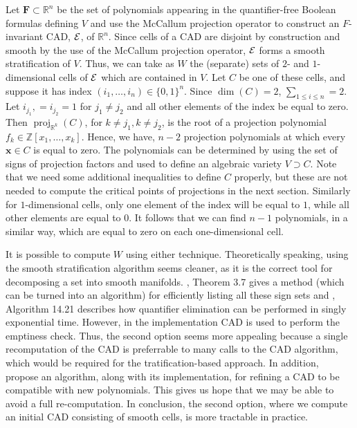 \documentclass[
]{book}
\theoremstyle{definition}
\theoremstyle{definition}
\theoremstyle{definition}
\theoremstyle{definition}
\theoremstyle{remark}
\begin{document}
Let \(\mathbf{F} \subset \mathbb{R}^n\) be the set of polynomials appearing in the quantifier-free Boolean formulas defining \(V\) and use the McCallum projection operator to construct an \(F\)-invariant CAD, \(\cal E\), of \(\mathbb{R}^n\). Since cells of a CAD are disjoint by construction and smooth by the use of the McCallum projection operator, \(\cal E\) forms a smooth stratification of \(V\).
Thus, we can take as \(W\) the (separate) sets of \(2\)- and \(1\)-dimensional cells of \(\cal E\) which are contained in \(V\).
Let \(C\) be one of these cells, and suppose it has index \((i_1,\ldots,i_n) \in \{0,1\}^n\). Since \(\dim(C) = 2\), \(\sum_{1\le i \le n} = 2\). Let \(i_{j_1}, = i_{j_2} = 1\) for \(j_1 \ne j_2\) and all other elements of the index be equal to zero. Then \({\operatorname{proj}_{\mathbb{R}^{k}}}(C)\), for \(k\ne j_1,k\ne j_2\), is the root of a projection polynomial \(f_k \in \mathbb{Z}[x_1,\ldots,x_k]\). Hence, we have, \(n-2\) projection polynomials at which every \(\mathbf{x} \in C\) is equal to zero.
The polynomials can be determined by using the set of signs of projection factors and used to define an algebraic variety \(V \supset C\). Note that we need some additional inequalities to define \(C\) properly, but these are not needed to compute the critical points of projections in the next section.
Similarly for \(1\)-dimensional cells, only one element of the index will be equal to \(1\), while all other elements are equal to \(0\). It follows that we can find \(n-1\) polynomials, in a similar way, which are equal to zero on each one-dimensional cell.

It is possible to compute \(W\) using either technique. Theoretically speaking, using the smooth stratification algorithm seems cleaner, as it is the correct tool for decomposing a set into smooth manifolds. \citet{gv04}, Theorem 3.7 gives a method (which can be turned into an algorithm) for efficiently listing all these sign sets and \citet{bpr2006}, Algorithm 14.21 describes how quantifier elimination can be performed in singly exponential time.
However, in the implementation
CAD is used to perform the emptiness check. Thus, the second option seems more appealing because a single recomputation of the CAD is preferrable to many calls to the CAD algorithm, which would be required for the tratification-based approach.
In addition, \citet{kremer2020} propose an algorithm, along with its implementation, for refining a CAD to be compatible with new polynomials. This gives us hope that we may be able to avoid a full re-computation. In conclusion, the second option, where we compute an initial CAD consisting of smooth cells, is more tractable in practice.
\end{document}
